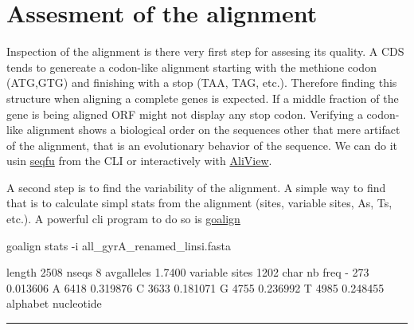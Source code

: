 \documentclass[
  letterpaper,
]{scrbook}
\newenvironment{Shaded}{\begin{snugshade}}{\end{snugshade}}
\newcommand{\AttributeTok}[1]{\textcolor[rgb]{0.40,0.46,0.14}{#1}}
\newcommand{\ExtensionTok}[1]{\textcolor[rgb]{0.00,0.46,0.62}{#1}}
\newcommand{\NormalTok}[1]{\textcolor[rgb]{0.00,0.46,0.62}{#1}}
\begin{document}
\hypertarget{assesment-of-the-alignment}{%
\section*{Assesment of the alignment}\label{assesment-of-the-alignment}}

Inspection of the alignment is there very first step for assesing its
quality. A CDS tends to genereate a codon-like alignment starting with
the methione codon (ATG,GTG) and finishing with a stop (TAA, TAG, etc.).
Therefore finding this structure when aligning a complete genes is
expected. If a middle fraction of the gene is being aligned ORF might
not display any stop codon. Verifying a codon-like alignment shows a
biological order on the sequences other that mere artifact of the
alignment, that is an evolutionary behavior of the sequence. We can do
it usin \href{https://telatin.github.io/seqfu2/}{seqfu} from the CLI or
interactively with \href{https://github.com/AliView/AliView}{AliView}.

A second step is to find the variability of the alignment. A simple way
to find that is to calculate simpl stats from the alignment (sites,
variable sites, As, Ts, etc.). A powerful cli program to do so is
\href{https://github.com/evolbioinfo/goalign}{goalign}

\begin{Shaded}
\begin{Highlighting}[]
\ExtensionTok{goalign}\NormalTok{ stats }\AttributeTok{{-}i}\NormalTok{ all\_gyrA\_renamed\_linsi.fasta}
\end{Highlighting}
\end{Shaded}

\begin{Shaded}
\begin{Highlighting}[]
\ExtensionTok{length}\NormalTok{  2508}
\ExtensionTok{nseqs}\NormalTok{   8}
\ExtensionTok{avgalleles}\NormalTok{  1.7400}
\ExtensionTok{variable}\NormalTok{ sites  1202}
\ExtensionTok{char}\NormalTok{    nb  freq}
\ExtensionTok{{-}}\NormalTok{   273 0.013606}
\ExtensionTok{A}\NormalTok{   6418    0.319876}
\ExtensionTok{C}\NormalTok{   3633    0.181071}
\ExtensionTok{G}\NormalTok{   4755    0.236992}
\ExtensionTok{T}\NormalTok{   4985    0.248455}
\ExtensionTok{alphabet}\NormalTok{    nucleotide}
\end{Highlighting}
\end{Shaded}

\begin{center}\rule{0.5\linewidth}{0.5pt}\end{center}
\end{document}
